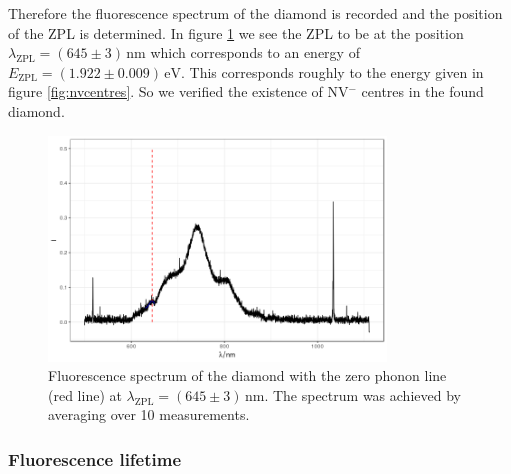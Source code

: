Therefore the fluorescence spectrum of the diamond is recorded and the position of the ZPL is determined. In figure \ref{fig:fluorescence} we see the ZPL to be at the position $\lambda_\text{ZPL}=(645\pm3)\,\mathrm{nm}$ which corresponds to an energy of $E_\text{ZPL}=(1.922\pm0.009)\,\mathrm{eV}$. This corresponds roughly to the energy given in figure \ref{fig:nvcentres}. So we verified the existence of NV$^-$ centres in the found diamond.
\begin{figure}
	\centering
	\includegraphics[width=0.8\textwidth]{../figures/fluorescence.png}
	\caption[Fluorescence spectrum of the diamond]{Fluorescence spectrum of the diamond with the zero phonon line (red line) at $\lambda_\text{ZPL}=(645\pm3)\,\mathrm{nm}$. The spectrum was achieved by averaging over 10 measurements.}
	\label{fig:fluorescence}
\end{figure}

\subsubsection{Fluorescence lifetime}

